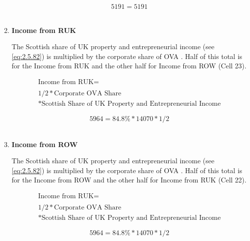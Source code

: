 \begin{enumerate}
\begin{equation} \nonumber
5191 = 5191
\end{equation}\\


\item \textbf {Income from RUK}

The Scottish share of UK property and entrepreneurial income (see \ref{eq:2.5.82}) is multiplied by the corporate share of OVA \cite{ScotGov2013a, ONS2011c}. Half of this total is for the Income from RUK and the other half for Income from ROW (Cell 23).

\begin{equation}
\begin{split}
\text{Income from RUK} =  \\ \\
1/2*\text{Corporate OVA Share}\\
*\text{Scottish Share of UK Property and Entrepreneurial Income}
\end{split} \label{eq:2.5.26}
\end{equation}

\begin{equation} \nonumber
5964 = 84.8\%*14070*1/2
\end{equation}\\


\item \textbf {Income from ROW}

The Scottish share of UK property and entrepreneurial income (see \ref{eq:2.5.82}) is multiplied by the corporate share of OVA \cite{ScotGov2013a, ONS2011c}. Half of this total is for the Income from ROW and the other half for Income from RUK (Cell 22).

\begin{equation}
\begin{split}
\text{Income from RUK} =  \\ \\
1/2*\text{Corporate OVA Share}\\
*\text{Scottish Share of UK Property and Entrepreneurial Income}
\end{split} \label{eq:2.5.27}
\end{equation}

\begin{equation} \nonumber
5964 = 84.8\%*14070*1/2
\end{equation}\\


\pagebreak


\end{enumerate}
